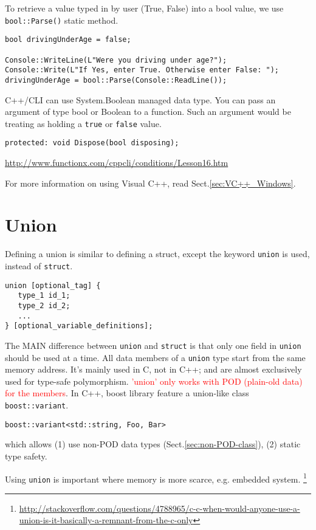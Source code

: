 To retrieve a value typed in by user (True, False) into a bool value, we use
\verb!bool::Parse()! static method.
\begin{verbatim}
bool drivingUnderAge = false;

Console::WriteLine(L"Were you driving under age?");
Console::Write(L"If Yes, enter True. Otherwise enter False: ");
drivingUnderAge = bool::Parse(Console::ReadLine());
\end{verbatim}


C++/CLI can use System.Boolean managed data type.  You can pass an argument of
type bool or Boolean to a function. Such an argument would be treating as
holding a \verb!true! or \verb!false! value.
\begin{verbatim}
protected: void Dispose(bool disposing);
\end{verbatim} 
\url{http://www.functionx.com/cppcli/conditions/Lesson16.htm}


For more information on using Visual C++, read Sect.\ref{sec:VC++_Windows}.


\section{Union}
\label{sec:union_C}

Defining a union is similar to defining a struct, except the keyword
\verb!union! is used, instead of \verb!struct!.
\begin{verbatim}
union [optional_tag] {
   type_1 id_1;
   type_2 id_2;
   ...
} [optional_variable_definitions]; 
\end{verbatim}

The MAIN difference between \verb!union! and \verb!struct! is that only one
field in \verb!union! should be used at a time. All data members of a
\verb!union! type start from the same memory address. It's mainly used in C, not
in C++; and are almost exclusively used for type-safe polymorphism.
\textcolor{red}{'union' only works with POD (plain-old data) for the members}.
In C++, boost library feature a union-like class \verb!boost::variant!.
\begin{verbatim}
boost::variant<std::string, Foo, Bar>
\end{verbatim}
which allows (1) use non-POD data types (Sect.\ref{sec:non-POD-class}), (2) static type safety.

Using \verb!union! is important where memory
is more scarce, e.g. embedded system.
\footnote{\url{http://stackoverflow.com/questions/4788965/c-c-when-would-anyone-use-a-union-is-it-basically-a-remnant-from-the-c-only}}


